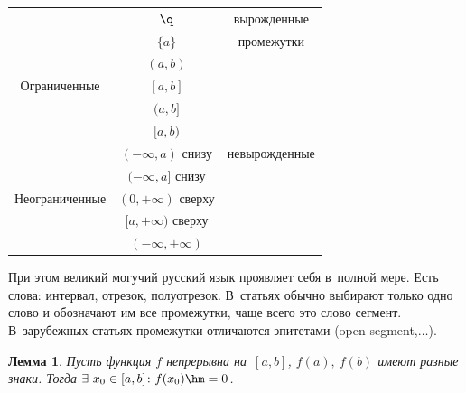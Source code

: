 \documentclass[a4paper,10pt,twoside]{article}
\newtheorem{Th}{Лемма}[section]
\begin{document}
 \begin{tabular}{|c|c|c|}
 \hline
        & $\q$      &вырожденные\\ \cline{2-2}
        &$\{a\}$    &промежутки\\ \hline
        &$(a,b)$    &           \\ \cline{2-2}
Ограниченные&$[a,b]$    & \\ \cline{2-2}
        &$(a,b]$    & \\ \cline{2-2}
        &$[a,b)$    & \\ \cline{1-2}
        &$(-\infty,a)$ снизу& невырожденные \\ \cline{2-2}
        &$(-\infty,a]$ снизу& \\ \cline{2-2}
Неограниченные&$(0,+\infty)$ сверху& \\ \cline{2-2}
        &$[a,+\infty)$ сверху& \\ \cline{2-2}
        &$(-\infty,+\infty)$& \\ \hline

\end{tabular}

При этом великий могучий русский язык проявляет себя в~полной мере.
Есть слова: интервал, отрезок, полуотрезок. 
В~статьях обычно выбирают только одно слово и обозначают им все промежутки, чаще всего это слово сегмент. 
В~зарубежных статьях промежутки отличаются эпитетами (open segment,$\ldots$).

\begin{Th}
Пусть функция $f$ непрерывна на~$[a,b]$, $f(a),\ f(b)$ имеют разные знаки. Тогда $\exists\  x_0\in[a,b]\colon
f(x_0)\hm=0$.
\end{Th}
\end{document}
